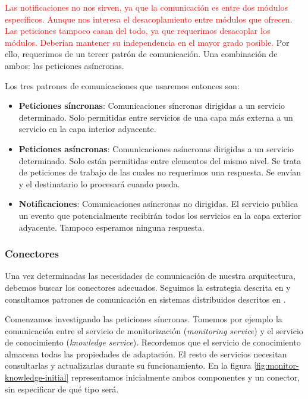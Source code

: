 \textcolor{red}{Las notificaciones no nos sirven, ya que la comunicación es entre dos módulos específicos. Aunque nos interesa el desacoplamiento entre módulos que ofrecen. Las peticiones tampoco casan del todo, ya que requerimos desacoplar los módulos. Deberían mantener su independencia en el mayor grado posible.} Por ello, requerimos de un tercer patrón de comunicación. Una combinación de ambos: las peticiones asíncronas.

Los tres patrones de comunicaciones que usaremos entonces son:

\begin{itemize}
  \item \textbf{Peticiones síncronas}: Comunicaciones síncronas dirigidas a un servicio determinado. Solo permitidas entre servicios de una capa más externa a un servicio en la capa interior adyacente.

  \item \textbf{Peticiones asíncronas}: Comunicaciones asíncronas dirigidas a un servicio determinado. Solo están permitidas entre elementos del mismo nivel. Se trata de peticiones de trabajo de las cuales no requerimos una respuesta. Se envían y el destinatario lo procesará cuando pueda.

  \item \textbf{Notificaciones}: Comunicaciones asíncronas no dirigidas. El servicio publica un evento que potencialmente recibirán todos los servicios en la capa exterior adyacente. Tampoco esperamos ninguna respuesta.
\end{itemize}

\subsubsection{Conectores}

Una vez determinadas las necesidades de comunicación de nuestra arquitectura, debemos buscar los conectores adecuados. Seguimos la estrategia descrita en \cite{taylorSoftwareArchitectureFoundations2009} y consultamos patrones de comunicación en sistemas distribuidos descritos en \cite{newmanBuildingMicroservicesDesigning2021}.

Comenzamos investigando las peticiones síncronas. Tomemos por ejemplo la comunicación entre el servicio de monitorización (\emph{monitoring service}) y el servicio de conocimiento (\emph{knowledge service}). Recordemos que el servicio de conocimiento almacena todas las propiedades de adaptación. El resto de servicios necesitan consultarlas y actualizarlas durante su funcionamiento. En la figura \ref{fig:monitor-knowledge-initial} representamos inicialmente ambos componentes y un conector, sin especificar de qué tipo será.

